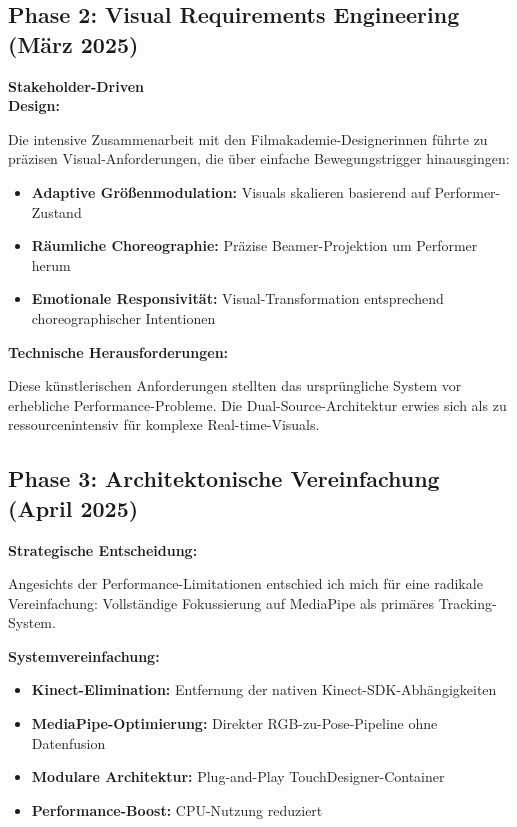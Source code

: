 \subsection{Phase 2: Visual Requirements Engineering (März 2025)}

\textbf{Stakeholder-Driven\\Design:}
\raggedright Die intensive Zusammenarbeit mit den Filmakademie-Designerinnen führte zu präzisen Visual-Anforderungen, die über einfache Bewegungstrigger hinausgingen:

\begin{itemize}
    \item \textbf{Adaptive Größenmodulation:} Visuals skalieren basierend auf Performer-Zustand
    \item \textbf{Räumliche Choreographie:} Präzise Beamer-Projektion um Performer herum
    \item \textbf{Emotionale Responsivität:} Visual-Transformation entsprechend choreographischer Intentionen
\end{itemize}


\textbf{Technische Herausforderungen:}
\raggedright Diese künstlerischen Anforderungen stellten das ursprüngliche System vor erhebliche Performance-Probleme. Die Dual-Source-Architektur erwies sich als zu ressourcenintensiv für komplexe Real-time-Visuals.

\newpage

\subsection{Phase 3: Architektonische Vereinfachung (April 2025)}

\textbf{Strategische Entscheidung:}
\raggedright Angesichts der Performance-Limitationen entschied ich mich für eine radikale Vereinfachung: Vollständige Fokussierung auf MediaPipe als primäres Tracking-System.

\textbf{Systemvereinfachung:}
\begin{itemize}
    \item \textbf{Kinect-Elimination:} Entfernung der nativen Kinect-SDK-Abhängigkeiten
    \item \textbf{MediaPipe-Optimierung:} Direkter RGB-zu-Pose-Pipeline ohne Datenfusion
    \item \textbf{Modulare Architektur:} Plug-and-Play TouchDesigner-Container
    \item \textbf{Performance-Boost:} CPU-Nutzung reduziert
\end{itemize}

